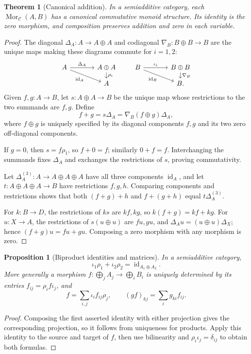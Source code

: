 \documentclass[11pt]{article}
\theoremstyle{definition}
\theoremstyle{plain}
\newtheorem{proposition}[definition]{Proposition}
\newtheorem{theorem}[definition]{Theorem}
\newcommand{\C}{\mathcal C}
\newcommand{\Mor}{\operatorname{Mor}}
\newcommand{\id}{\operatorname{id}}
\begin{document}
\begin{theorem}[Canonical addition]\label{thm:addition}
In a semiadditive category, each $\Mor_{\C}(A,B)$ has a canonical commutative monoid structure. Its identity is the zero morphism, and composition preserves addition and zero in each variable.
\end{theorem}
\begin{proof}
The diagonal $\Delta_A\colon A\to A\oplus A$ and codiagonal $\nabla_B\colon B\oplus B\to B$ are the unique maps making these diagrams commute for $i=1,2$:
\[
\begin{tikzcd}[column sep=large,row sep=small]
A\arrow[r,"\Delta_A"]\arrow[dr,"\id_A"']&A\oplus A\arrow[d,"\rho_i"]\\
&A
\end{tikzcd}
\qquad
\begin{tikzcd}[column sep=large,row sep=small]
B\arrow[r,"\iota_i"]\arrow[dr,"\id_B"']&B\oplus B\arrow[d,"\nabla_B"]\\
&B.
\end{tikzcd}
\]
Given $f,g\colon A\to B$, let $s\colon A\oplus A\to B$ be the unique map whose restrictions to the two summands are $f,g$. Define
\[
f+g=s\Delta_A=\nabla_B(f\oplus g)\Delta_A,
\]
where $f\oplus g$ is uniquely specified by its diagonal components $f,g$ and its two zero off-diagonal components.

If $g=0$, then $s=f\rho_1$, so $f+0=f$; similarly $0+f=f$. Interchanging the summands fixes $\Delta_A$ and exchanges the restrictions of $s$, proving commutativity.

Let $\Delta_A^{(3)}\colon A\to A\oplus A\oplus A$ have all three components $\id_A$, and let $t\colon A\oplus A\oplus A\to B$ have restrictions $f,g,h$. Comparing components and restrictions shows that both $(f+g)+h$ and $f+(g+h)$ equal $t\Delta_A^{(3)}$.

For $k\colon B\to D$, the restrictions of $ks$ are $kf,kg$, so $k(f+g)=kf+kg$. For $u\colon X\to A$, the restrictions of $s(u\oplus u)$ are $fu,gu$, and $\Delta_Au=(u\oplus u)\Delta_X$; hence $(f+g)u=fu+gu$. Composing a zero morphism with any morphism is zero.
\end{proof}

\begin{proposition}[Biproduct identities and matrices]
In a semiadditive category,
\[
\iota_1\rho_1+\iota_2\rho_2=\id_{A_1\oplus A_2}.
\]
More generally a morphism $f\colon\bigoplus_j A_j\to\bigoplus_i B_i$ is uniquely determined by its entries $f_{ij}=\rho_i f\iota_j$, and
\[
f=\sum_{i,j}\iota_i f_{ij}\rho_j,\qquad (gf)_{kj}=\sum_i g_{ki}f_{ij}.
\]
\end{proposition}
\begin{proof}
Composing the first asserted identity with either projection gives the corresponding projection, so it follows from uniqueness for products. Apply this identity to the source and target of $f$, then use bilinearity and $\rho_i\iota_j=\delta_{ij}$ to obtain both formulas.
\end{proof}
\end{document}
